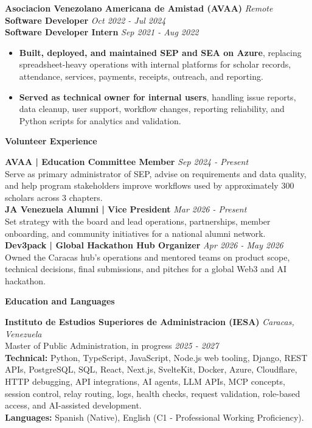 \documentclass[10pt]{article}
\newcommand{\sectiontitle}[1]{%
    \vspace{3pt}
    \begin{center}
        \textbf{#1}
    \end{center}
    \vspace{-5pt}
}
\begin{document}
\vspace{1pt}
\textbf{Asociacion Venezolano Americana de Amistad (AVAA)} \hfill \textit{Remote} \\
\textbf{Software Developer} \hfill \textit{Oct 2022 - Jul 2024} \\
\textbf{Software Developer Intern} \hfill \textit{Sep 2021 - Aug 2022}
\begin{itemize}
    \item \textbf{Built, deployed, and maintained SEP and SEA on Azure}, replacing spreadsheet-heavy operations with internal platforms for scholar records, attendance, services, payments, receipts, outreach, and reporting.
    \item \textbf{Served as technical owner for internal users}, handling issue reports, data cleanup, user support, workflow changes, reporting reliability, and Python scripts for analytics and validation.
\end{itemize}

\sectiontitle{Volunteer Experience}
\textbf{AVAA | Education Committee Member} \hfill \textit{Sep 2024 - Present} \\
Serve as primary administrator of SEP, advise on requirements and data quality, and help program stakeholders improve workflows used by approximately 300 scholars across 3 chapters. \\
\textbf{JA Venezuela Alumni | Vice President} \hfill \textit{Mar 2026 - Present} \\
Set strategy with the board and lead operations, partnerships, member onboarding, and community initiatives for a national alumni network. \\
\textbf{Dev3pack | Global Hackathon Hub Organizer} \hfill \textit{Apr 2026 - May 2026} \\
Owned the Caracas hub's operations and mentored teams on product scope, technical decisions, final submissions, and pitches for a global Web3 and AI hackathon.

\sectiontitle{Education and Languages}
\textbf{Instituto de Estudios Superiores de Administracion (IESA)} \hfill \textit{Caracas, Venezuela} \\
Master of Public Administration, in progress \hfill \textit{2025 - 2027} \\
\textbf{Technical:} Python, TypeScript, JavaScript, Node.js web tooling, Django, REST APIs, PostgreSQL, SQL, React, Next.js, SvelteKit, Docker, Azure, Cloudflare, HTTP debugging, API integrations, AI agents, LLM APIs, MCP concepts, session control, relay routing, logs, health checks, request validation, role-based access, and AI-assisted development. \\
\textbf{Languages:} Spanish (Native), English (C1 - Professional Working Proficiency).
\end{document}
